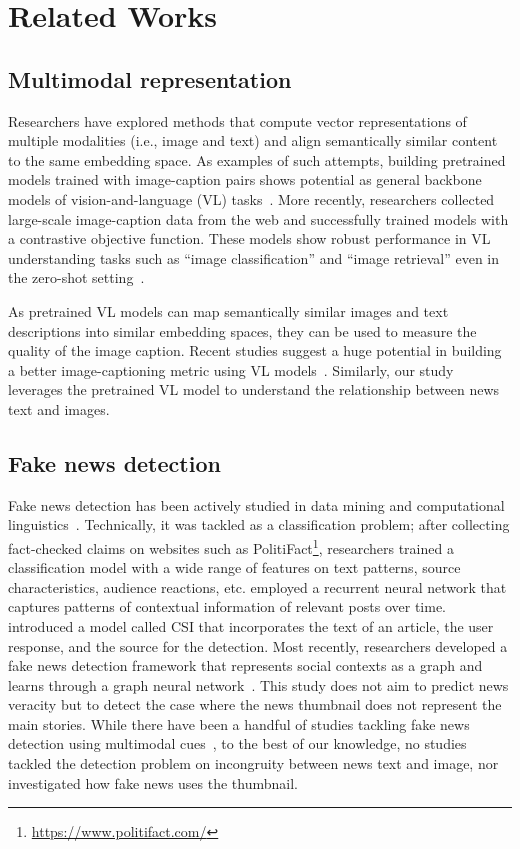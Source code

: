 \documentclass[11pt]{article}
\begin{document}
\section{Related Works}
\label{sec:related}

\subsection{Multimodal representation}
Researchers have explored methods that compute vector representations of multiple modalities (i.e., image and text) and align semantically similar content to the same embedding space. As examples of such attempts, building pretrained models trained with image-caption pairs shows potential as general backbone models of vision-and-language (VL) tasks~\cite{lu2019vilbert, chen2020uniter}. More recently, researchers collected large-scale image-caption data from the web and successfully trained models with a contrastive objective function. These models show robust performance in VL understanding tasks such as ``image classification'' and ``image retrieval'' even in the zero-shot setting~\cite{radford2021learning, jia2021scaling,kim2021vilt}.

As pretrained VL models can map semantically similar images and text descriptions into similar embedding spaces, they can be used to measure the quality of the image caption. Recent studies suggest a huge potential in building a better image-captioning metric using VL models~\cite {lee2020vilbertscore, lee2021umic, hessel2021clipscore}. Similarly, our study leverages the pretrained VL model to understand the relationship between news text and images. 

\subsection{Fake news detection}

Fake news detection has been actively studied in data mining and computational linguistics~\cite{10.1145/3137597.3137600}. Technically, it was tackled as a classification problem; after collecting fact-checked claims on websites such as PolitiFact\footnote{\url{https://www.politifact.com/}}, researchers trained a classification model with a wide range of features on text patterns, source characteristics, audience reactions, etc. \citet{10.5555/3061053.3061153} employed a recurrent neural network that captures patterns of contextual information of relevant posts over time. \citet{10.1145/3132847.3132877} introduced a model called CSI that incorporates the text of an article, the user response, and the source for the detection. Most recently, researchers developed a fake news detection framework that represents social contexts as a graph and learns through a graph neural network~\cite{nguyen2020fang}. This study does not aim to predict news veracity but to detect the case where the news thumbnail does not represent the main stories. 
While there have been a handful of studies tackling fake news detection using multimodal cues~\cite{8919302,8970940,9260096,10.1145/3308558.3313552}, to the best of our knowledge, no studies tackled the detection problem on incongruity between news text and image, nor investigated how fake news uses the thumbnail.
\end{document}
